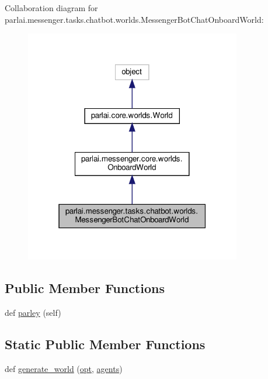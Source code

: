 Collaboration diagram for parlai.\+messenger.\+tasks.\+chatbot.\+worlds.\+Messenger\+Bot\+Chat\+Onboard\+World\+:
\nopagebreak
\begin{figure}[H]
\begin{center}
\leavevmode
\includegraphics[width=268pt]{classparlai_1_1messenger_1_1tasks_1_1chatbot_1_1worlds_1_1MessengerBotChatOnboardWorld__coll__graph}
\end{center}
\end{figure}
\subsection*{Public Member Functions}
\begin{DoxyCompactItemize}
\item 
def \hyperlink{classparlai_1_1messenger_1_1tasks_1_1chatbot_1_1worlds_1_1MessengerBotChatOnboardWorld_af413fb649228fad66abc16a3f3295543}{parley} (self)
\end{DoxyCompactItemize}
\subsection*{Static Public Member Functions}
\begin{DoxyCompactItemize}
\item 
def \hyperlink{classparlai_1_1messenger_1_1tasks_1_1chatbot_1_1worlds_1_1MessengerBotChatOnboardWorld_ab2a2d31bff19f1347c0a90a17ca7390e}{generate\+\_\+world} (\hyperlink{classparlai_1_1core_1_1worlds_1_1World_a3640d92718acd3e6942a28c1ab3678bd}{opt}, \hyperlink{classparlai_1_1core_1_1worlds_1_1World_a728f75194cc26ea4035047c46cf62608}{agents})
\end{DoxyCompactItemize}
